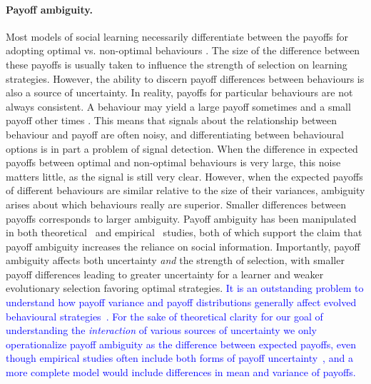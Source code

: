 \documentclass[letterpaper,11.5pt]{scrartcl}
\newcommand{\edit}[1]{{\textcolor{blue} {#1}}}
\begin{document}
\paragraph{Payoff ambiguity.} Most models of social learning necessarily differentiate between the payoffs for adopting optimal vs. non-optimal behaviours
\citep{BoydRicherson1985,Rogers1988,Enquist2007,Rendell2010,aoki2014evolution}. The size of the difference between these payoffs is usually taken to influence the strength of selection on learning strategies.
However, the ability to discern payoff differences between behaviours is also a source of uncertainty. In reality, payoffs for particular behaviours are not always consistent. A behaviour may yield a large payoff sometimes and a small
payoff other times \citep{McElreath2005}. This means that signals about the
relationship between behaviour and payoff are often noisy, and differentiating
between behavioural options is in part a problem of signal detection. When the
difference in expected payoffs between optimal and non-optimal behaviours is very
large, this noise matters little, as the signal is still very clear. However, when
the expected payoffs of different behaviours are similar relative to the size of
their variances, ambiguity arises about which behaviours really are superior.
Smaller differences between payoffs corresponds to larger ambiguity. Payoff
ambiguity has been manipulated in both theoretical~\citep{perreault2012bayesian}
and empirical~\citep{McElreath2005,Toyokawa2019} studies, both of which support the
claim that payoff ambiguity increases the reliance on social information.
Importantly, payoff ambiguity %
affects both uncertainty \emph{and} the strength of selection, with smaller payoff differences leading to greater uncertainty for a learner and weaker evolutionary selection favoring optimal strategies. 
\edit{It is an outstanding problem to understand how payoff variance and payoff distributions
generally affect evolved behavioural strategies~\citep{Haaland2019}. For the sake
of theoretical clarity for our goal of understanding the \emph{interaction} of various sources of uncertainty
we only operationalize payoff ambiguity as the difference between expected 
payoffs, even though empirical studies often include both forms of payoff
uncertainty~\citep{McElreath2005,Toyokawa2019}, and a more complete
model would include differences in mean and variance of payoffs.}

\end{document}
